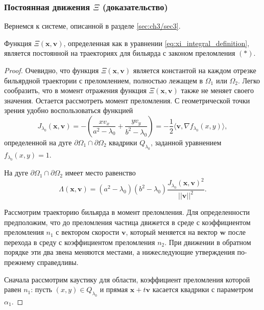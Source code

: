 \subsubsection{Постоянная движения $\Xi$ (доказательство)}\label{sec:ch3/sec3/sub2}
Вернемся к системе, описанной в разделе \ref{sec:ch3/sec3}.
\begin{theorem}
    Функция $\Xi(\mathbf{x}, \mathbf{v})$, определенная как в уравнении \eqref{eq:xi_integral_definition}, является постоянной на траекториях для бильярда с законом преломления $(\ast)$.
\label{th:xi_is_integral}
\end{theorem} 
\begin{proof}


Очевидно, что функция $\Xi(\mathbf{x}, \mathbf{v})$ является константой на каждом отрезке бильярдной траектории с преломлением, полностью лежащем в $\Omega_1$ или $\Omega_2$. Легко сообразить, что в момент отражения функция $\Xi(\mathbf{x}, \mathbf{v})$ также не меняет своего значения. Остается рассмотреть  момент преломления. С геометрической точки зрения удобно воспользоваться функцией  
$$J_{\lambda_0}(\mathbf{x}, \mathbf{v}) = -\left(\frac{x v_x}{a^2-\lambda_0} + \frac{y v_y}{b^2-\lambda_0} \right) = -\frac{1}{2}\langle\mathbf{v}, \nabla f_{\lambda_0}(x,y)\rangle,$$
определенной на дуге $\partial \Omega_1 \cap \partial \Omega_2$ квадрики $Q_{\lambda_0}$, заданной уравнением $f_{\lambda_0}(x, y) = 1$.

На дуге  $\partial \Omega_1 \cap \partial \Omega_2$ имеет место равенство
 $$\Lambda(\mathbf{x}, \mathbf{v})=(a^2-\lambda_0)(b^2-\lambda_0)\frac{J_{\lambda_0}(\mathbf{x}, \mathbf{v})^2}{||\mathbf{v}||^2}.$$

Рассмотрим траекторию бильярда в момент преломления. Для определенности предположим, что  до преломления частица движется в среде с коэффициентом преломления $n_1$ с вектором скорости $\mathbf{v}$, который меняется на вектор $\mathbf{w}$ после перехода в среду с коэффициентом преломления $n_2$. При движении в обратном порядке эти два звена меняются местами, а нижеследующие утверждения по-прежнему справедливы.

Сначала рассмотрим каустику для области, коэффициент преломления которой равен $n_1$: пусть $(x,y) \in Q_{\lambda_0}$ и прямая $\mathbf{x}+t \mathbf{v}$ касается квадрики с параметром $\alpha_1$. 



\end{proof}
